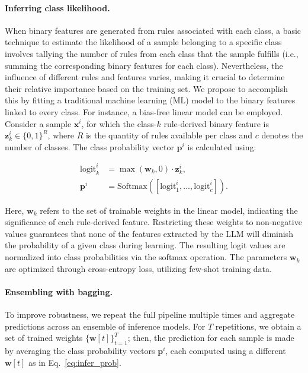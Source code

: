 \paragraph{Inferring class likelihood.} When binary features are generated from rules associated with each class, a basic technique to estimate the likelihood of a sample belonging to a specific class involves tallying the number of rules from each class that the sample fulfills (i.e., summing the corresponding binary features for each class). Nevertheless, the influence of different rules and features varies, making it crucial to determine their relative importance based on the training set. We propose to accomplish this by fitting a traditional machine learning (ML) model to the binary features linked to every class. For instance, a bias-free linear model can be employed. Consider a sample $\mathbf{x}^i$, for which the class-$k$ rule-derived binary feature is $\mathbf{z}_k^i \in \{0, 1\}^R$, where $R$ is the quantity of rules available per class and $c$ denotes the number of classes. The class probability vector $\mathbf{p}^i$ is calculated using:

\begin{align}
\text{logit}_k^i &= \max(\mathbf{w}_k, 0) \cdot \mathbf{z}_k^i, \nonumber \\
\mathbf{p}^i &= \text{Softmax}({[\text{logit}_{1}^i, ..., \text{logit}_{c}^i]}). \label{eq:infer_prob}
\end{align}

Here, $\mathbf{w}_k$ refers to the set of trainable weights in the linear model, indicating the significance of each rule-derived feature. Restricting these weights to non-negative values guarantees that none of the features extracted by the LLM will diminish the probability of a given class during learning. The resulting logit values are normalized into class probabilities via the softmax operation. The parameters $\mathbf{w}_k$ are optimized through cross-entropy loss, utilizing few-shot training data. 

\vspace*{-0.12in}
\paragraph{Ensembling with bagging.} To improve robustness, we repeat the full pipeline multiple times and aggregate predictions across an ensemble of inference models. For $T$ repetitions, we obtain a set of trained weights $\{\mathbf{w}[t]\}_{t=1}^T$; then, the prediction for each sample is made by averaging the class probability vectors $\mathbf{p}^i$, each computed using a different $\mathbf{w}[t]$ as in Eq.~\ref{eq:infer_prob}.


